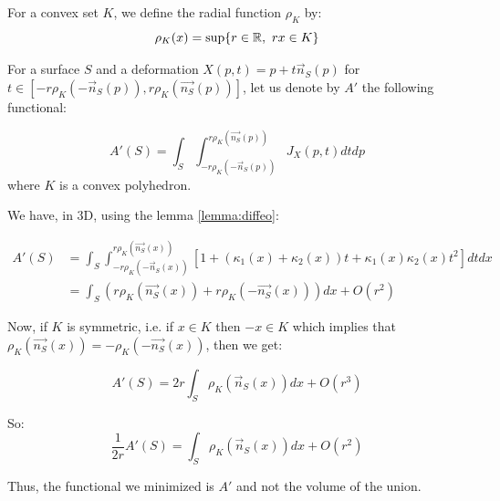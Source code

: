 \begin{definition}
    For a convex set $ K $, we define the radial function $ \rho_K $ by:
    $$ \rho_K(x) = \sup \{ r \in \mathbb{R},~rx \in K \} $$
\end{definition}

For a surface $ S $ and a deformation $ X(p, t) = p + t \vec{n}_S(p) $ for $ t \in
[-r \rho_K(-\vec{n}_S(p)), r \rho_K(\vec{n_S}(p)) ] $, let us denote by $ A' $
the following functional:

\begin{equation}
    A'(S) = \int_S \int_{-r \rho_K(-\vec{n}_S(p))}^{r \rho_K(\vec{n_S}(p))}
    J_X(p, t) dt dp
\end{equation}
where $ K $ is a convex polyhedron.

We have, in 3D, using the lemma \ref{lemma:diffeo}:

\begin{align*}
    A'(S) &= \int_S \int_{-r \rho_K(-\vec{n}_S(x))}^{r \rho_K(\vec{n_S}(x))}
    \left[ 1 + (\kappa_1(x) + \kappa_2(x)) t + \kappa_1(x) \kappa_2(x) t^2
    \right] dt dx \\
    &= \int_S (r \rho_K(\vec{n_S}(x)) + r \rho_K(-\vec{n_S}(x))) dx + O(r^2)
\end{align*}

Now, if $ K $ is symmetric, i.e. if $ x \in K $ then $ -x \in K $ which implies
that $ \rho_K(\vec{n_S}(x)) = -\rho_K(-\vec{n_S}(x)) $, then we get:

\begin{equation}
    A'(S) = 2r \int_S \rho_K(\vec{n}_S(x)) dx + O(r^3)
\end{equation}

So:
\begin{equation}
    \frac{1}{2r} A'(S) = \int_S \rho_K(\vec{n}_S(x)) dx + O(r^2)
\end{equation}

Thus, the functional we minimized is $ A' $ and not the volume of the union.

